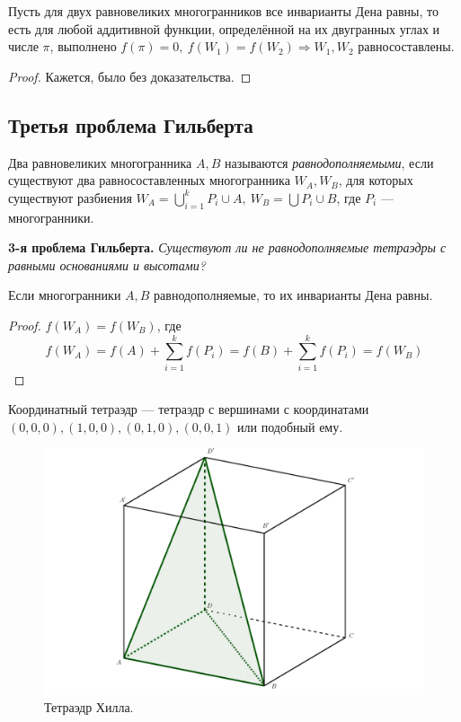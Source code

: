 \begin{theorem}[Сидлер]
    Пусть для двух равновеликих многогранников все инварианты Дена равны, то есть для любой аддитивной функции, определённой на их двугранных углах и числе $\pi$, выполнено $f(\pi) = 0, \ f(W_1) = f(W_2) \Rightarrow W_1, W_2$ равносоставлены.
\end{theorem}
\begin{proof}
    Кажется, было без доказательства.
\end{proof} 

\subsection{Третья проблема Гильберта}
\begin{definition}
    Два равновеликих многогранника $A, B$ называются \textit{равнодополняемыми}, если существуют два равносоставленных многогранника $W_A, W_B$, для которых существуют разбиения $W_A = \bigcup_{i = 1}^k P_i \cup A, \ W_B = \bigcup P_i \cup B$, где $P_i$ — многогранники.
\end{definition}

\noindent \textbf{3-я проблема Гильберта.}
\textit{Существуют ли не равнодополняемые тетраэдры с равными основаниями и высотами?}

\begin{statement}
    Если многогранники $A,B$ равнодополняемые, то их инварианты Дена равны.
\end{statement}
\begin{proof}
    $f(W_A) = f(W_B)$, где $$f(W_A) = f(A) + \sum_{i = 1}^{k} f(P_i) = f(B) + \sum_{i = 1}^{k} f(P_i) = f(W_B)$$
\end{proof}

\begin{definition}
    Координатный тетраэдр — тетраэдр с вершинами с координатами $(0,0,0), (1,0,0), (0,1,0), (0,0,1)$ или подобный ему.
\end{definition} 

\begin{figure}[h]
    \centering
    \includegraphics[scale=0.2]{images/c9.7.png}
    \caption{Тетраэдр Хилла.}
    \label{fig:c9.7}
\end{figure}

